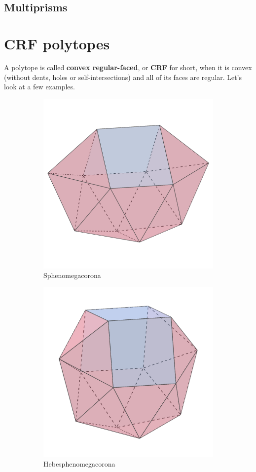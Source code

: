 \documentclass{article}
\begin{document}
\subsection{Multiprisms}

\section{CRF polytopes}
A polytope is called \textbf{convex regular-faced}, or \textbf{CRF} for short, when it is convex (without dents, holes or self-intersections) and all of its faces are regular. Let's look at a few examples.

\begin{figure}[h]
  \centering
  \begin{subfigure}{.33333\textwidth}
    \centering
    \includegraphics[width=.5\linewidth]{Sphenomegacorona}
    \caption{Sphenomegacorona}
    \label{fig:polyhedra_1}
  \end{subfigure}%
  \begin{subfigure}{.33333\textwidth}
    \centering
    \includegraphics[width=.5\linewidth]{Hebesphenomegacorona}
    \caption{Hebesphenomegacorona}
    \label{fig:polyhedra_2}
  \end{subfigure}%
  \begin{subfigure}{.33333\textwidth}

\end{subfigure}
\end{figure}
\end{document}
